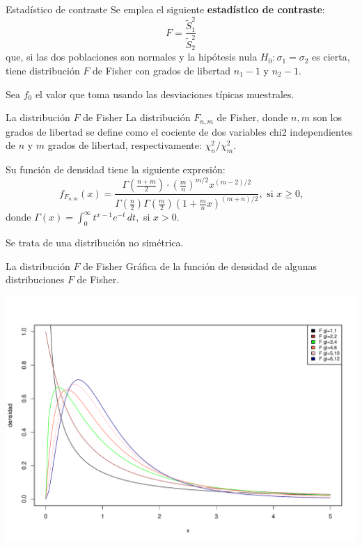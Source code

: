 \documentclass[
  ignorenonframetext,
]{beamer}
\begin{document}
\begin{frame}{Estadístico de contraste}
\protect\hypertarget{estaduxedstico-de-contraste}{}
Se emplea el siguiente \textbf{estadístico de contraste}: \[
F=\frac{\widetilde{S}_1^2}{\widetilde{S}_2^2}
\] que, si las dos poblaciones son normales y la hipótesis nula
\(H_0:\sigma_1=\sigma_2\) es cierta, tiene distribución \(F\) de Fisher
con grados de libertad \(n_1-1\) y \(n_2-1\).

Sea \(f_0\) el valor que toma usando las desviaciones típicas
muestrales.
\end{frame}

\begin{frame}{La distribución \(F\) de Fisher}
\protect\hypertarget{la-distribuciuxf3n-f-de-fisher}{}
La distribución \(F_{n,m}\) de Fisher, donde \(n,m\) son los grados de
libertad se define como el cociente de dos variables chi2 independientes
de \(n\) y \(m\) grados de libertad, respectivamente:
\({\chi_{n}^2}/{\chi_m^2}\).

Su función de densidad tiene la siguiente expresión: \[
f_{F_{n,m}}(x)=\frac{\Gamma\left(\frac{n+m}2\right)\cdot\left(\frac{m}{n}\right)^{m/2}x^{(m-2)/2}}
{\Gamma\left(\frac{n}2\right)\Gamma\left(\frac{m}2\right)\left(1+\frac{m}{n}x\right)^{(m+n)/2}},
\mbox{ si $x\geq 0$,}
\] donde \(\Gamma(x)=\int_0^{\infty} t^{x-1}e^{-t}\, dt,\) si \(x> 0\).

Se trata de una distribución no simétrica.
\end{frame}

\begin{frame}{La distribución \(F\) de Fisher}
\protect\hypertarget{la-distribuciuxf3n-f-de-fisher-1}{}
Gráfica de la función de densidad de algunas distribuciones \(F\) de
Fisher.

\includegraphics{contrastes_dos_muestras_files/figure-beamer/unnamed-chunk-53-1.pdf}
\end{frame}
\end{document}
